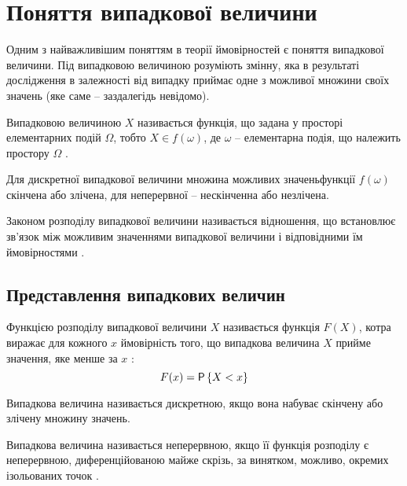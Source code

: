 
\section{Поняття випадкової величини}
Одним з найважливішим поняттям в теорії ймовірностей є поняття випадкової величини. Під випадковою величиною розуміють змінну, яка в результаті дослідження в залежності від випадку приймає одне з можливої множини своїх значень (яке саме – заздалегідь невідомо).

\begin{defin}
	Випадковою величиною $X$ називається функція, що задана у просторі елементарних подій $\Omega$, тобто $X \in f(\omega)$, де $\omega$ – елементарна подія, що належить простору $\Omega$ \cite{kremer2004}.
\end{defin}

Для дискретної випадкової величини множина можливих значеньфункції $f(\omega)$ скінчена або злічена, для неперервної – нескінченна або незлічена.

\begin{defin}
	Законом розподілу випадкової величини називається відношення, що встановлює зв'язок між можливим значеннями випадкової величини і відповідними їм ймовірностями \cite{kremer2004}.
\end{defin}

\subsection{Представлення випадкових величин}
\begin{defin}
	Функцією розподілу випадкової величини $X$ називається функція $F(X)$, котра виражає для кожного $x$ ймовірність того, що випадкова величина $X$ прийме значення, яке менше за $x$ \cite{kremer2004}:
	\begin{equation}
		F(x)=\mathsf{P}\left\{X < x\right\}
	\end{equation}
\end{defin}

\begin{defin}
	Випадкова величина називається дискретною, якщо вона набуває скінчену або злічену множину значень.
\end{defin}

\begin{defin}
	Випадкова величина називається неперервною, якщо її функція розподілу є неперервною, диференційованою майже скрізь, за винятком, можливо, окремих ізольованих точок \cite{kremer2004}.
\end{defin}

